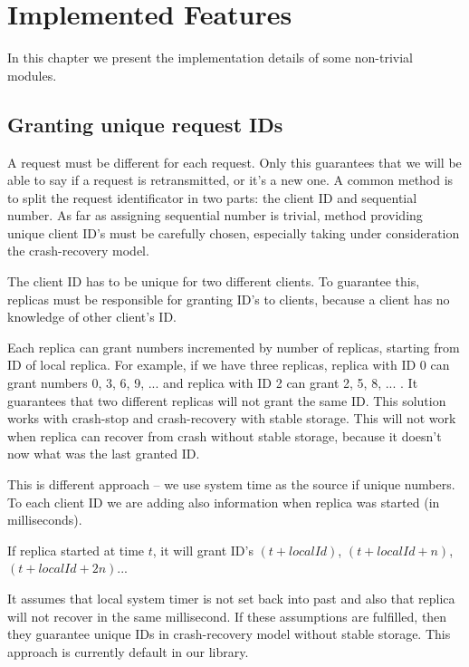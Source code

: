 \chapter{Implemented Features}

In this chapter we present the implementation details of some non-trivial modules.

\section{Granting unique request IDs}

A request must be different for each request. Only this guarantees that we will be able to say if a request is retransmitted, or it's a new one. A common method is to split the request identificator in two parts: the client ID and sequential number. As far as assigning sequential number is trivial, method providing unique client ID's must be carefully chosen, especially taking under consideration the crash-recovery model.

The client ID has to be unique for two different clients. To guarantee this, replicas must be responsible for granting ID's to clients, because a client has no knowledge of other client's ID.

Each replica can grant numbers incremented by number of replicas, starting from ID of local replica. For example, if we have three replicas, replica with ID 0 can grant numbers 0, 3, 6, 9, ... and replica with ID 2 can grant 2, 5, 8, ... . It guarantees that two different replicas will not grant the same ID. This solution works with crash-stop and crash-recovery with stable storage. This will not work when replica can recover from crash without stable storage, because it doesn't now what was the last granted ID.

This is different approach -- we use system time as the source if unique numbers. To each client ID we are adding also information when replica was started (in milliseconds).

If replica started at time $t$, it will grant ID's $(t + localId)$, $(t + localId + n)$, $(t + localId + 2n)$...

It assumes that local system timer is not set back into past and also that replica will not recover in the same millisecond. If these assumptions are fulfilled, then they guarantee unique IDs in crash-recovery model without stable storage. This approach is currently default in our library.

